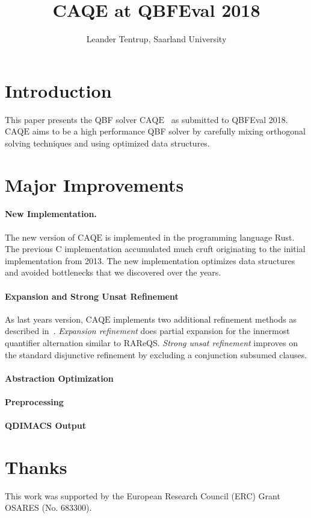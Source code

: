 \documentclass[11pt,twocolumn]{article}
\title{CAQE at QBFEval 2018}
\author{Leander Tentrup, Saarland University}
\date{}
\newcommand{\caqe}{\text{CAQE}}
\begin{document}
  \maketitle
  
\section{Introduction}

This paper presents the QBF solver $\caqe$~\cite{conf/fmcad/RabeT15} as submitted to QBFEval 2018.
$\caqe$ aims to be a high performance QBF solver by carefully mixing orthogonal solving techniques and using optimized data structures.

\section{Major Improvements}

\paragraph{New Implementation.}

The new version of $\caqe$ is implemented in the programming language Rust.
The previous C implementation accumulated much cruft originating to the initial implementation from 2013.
The new implementation optimizes data structures and avoided bottlenecks that we discovered over the years.

\paragraph{Expansion and Strong Unsat Refinement}

As last years version, $\caqe$ implements two additional refinement methods as described in~\cite{conf/cav/Tentrup17}.
\emph{Expansion refinement} does partial expansion for the innermost quantifier alternation similar to RAReQS.
\emph{Strong unsat refinement} improves on the standard disjunctive refinement by excluding a conjunction subsumed clauses.

\paragraph{Abstraction Optimization}

\paragraph{Preprocessing}

\paragraph{QDIMACS Output}


\section{Thanks}

This work was supported by the European Research Council (ERC) Grant OSARES (No. 683300).




\end{document}
